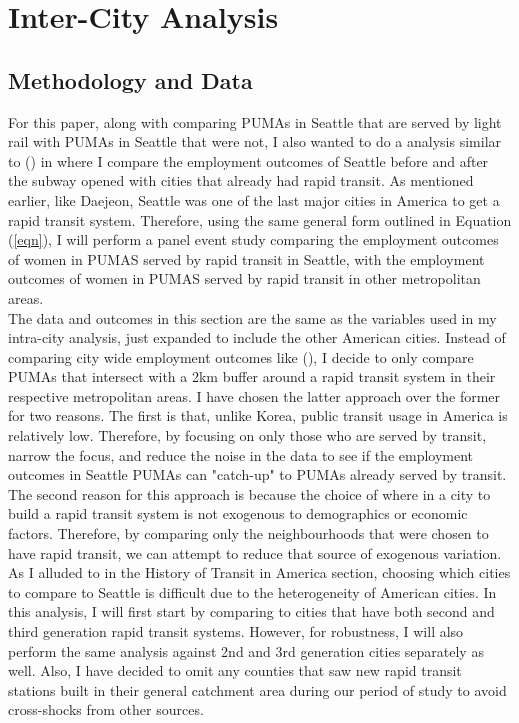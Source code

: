 \documentclass{article}
\begin{document}
\section{Inter-City Analysis}

\subsection{Methodology and Data}

For this paper, along with comparing PUMAs in Seattle that are served by light rail with PUMAs in Seattle that were not, I also wanted to do a analysis similar to \citeauthor{kim_subways_2019} (\citeyear{kim_subways_2019}) in where I compare the employment outcomes of Seattle before and after the subway opened with cities that already had rapid transit. As mentioned earlier, like Daejeon, Seattle was one of the last major cities in America to get a rapid transit system. Therefore, using the same general form outlined in Equation (\ref{eqn}), I will perform a panel event study comparing the employment outcomes of women in PUMAS served by rapid transit in Seattle, with the employment outcomes of women in PUMAS served by rapid transit in other metropolitan areas.  \\

The data and outcomes in this section are the same as the variables used in my intra-city analysis, just expanded to include the other American cities. Instead of comparing city wide employment outcomes like \citeauthor{kim_subways_2019} (\citeyear{kim_subways_2019}), I decide to only compare PUMAs that intersect with a 2km buffer around a rapid transit system in their respective metropolitan areas. I have chosen the latter approach over the former for two reasons. The first is that, unlike Korea, public transit usage in America is relatively low. Therefore, by focusing on only those who are served by transit, narrow the focus, and reduce the noise in the data to see if the employment outcomes in Seattle PUMAs can "catch-up" to PUMAs already served by transit. The second reason for this approach is because the choice of where in a city to build a rapid transit system is not exogenous to demographics or economic factors. Therefore, by comparing only the neighbourhoods that were chosen to have rapid transit, we can attempt to reduce that source of exogenous variation.\\

As I alluded to in the History of Transit in America section, choosing which cities to compare to Seattle is difficult due to the heterogeneity of American cities. In this analysis, I will first start by comparing to cities that have both second and third generation rapid transit systems. However, for robustness, I will also perform the same analysis against 2nd and 3rd generation cities separately as well. Also, I have decided to omit any counties that saw new rapid transit stations built in their general catchment area during our period of study to avoid cross-shocks from other sources. \\
\end{document}
